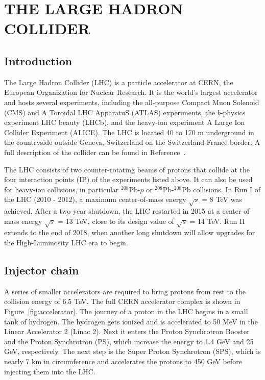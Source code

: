 \chapter{THE LARGE HADRON COLLIDER}
\label{chap:LHC}

\section{Introduction}
\label{sec:LHCintro}
The Large Hadron Collider (LHC) is a particle accelerator at CERN, the European Organization for Nuclear Research. It is the world's largest accelerator and hosts several experiments, including the all-purpose Compact Muon Solenoid (CMS) and A Toroidal LHC ApparatuS (ATLAS) experiments, the $b$-physics experiment LHC beauty (LHCb), and the heavy-ion experiment A Large Ion Collider Experiment (ALICE). The LHC is located 40 to 170 m underground in the countryside outside Geneva, Switzerland on the Switzerland-France border. A full description of the collider can be found in Reference~\cite{LHCMachine}.

The LHC consists of two counter-rotating beams of protons that collide at the four interaction points (IP) of the experiments listed above. It can also be used for heavy-ion collisions, in particular $^{208}$Pb-$p$ or $^{208}$Pb-$^{208}$Pb collisions. In Run I of the LHC (2010 - 2012), a maximum center-of-mass energy $\sqrt{s}$ = 8 TeV was achieved. After a two-year shutdown, the LHC restarted in 2015 at a center-of-mass energy $\sqrt{s}$ = 13 TeV, close to its design value of $\sqrt{s}$ = 14 TeV. Run II extends to the end of 2018, when another long shutdown will allow upgrades for the High-Luminosity LHC era to begin.

\section{Injector chain}
\label{sec:injector}
A series of smaller accelerators are required to bring protons from rest to the collision energy of 6.5 TeV. The full CERN accelerator complex is shown in Figure~\ref{fig:accelerator}. The journey of a proton in the LHC begins in a small tank of hydrogen. The hydrogen gets ionized and is accelerated to 50 MeV in the Linear Accelerator 2 (Linac 2). Next it enters the Proton Synchrotron Booster and the Proton Synchrotron (PS), which increase the energy to 1.4 GeV and 25 GeV, respectively. 
The next step is the Super Proton Synchrotron (SPS), which is nearly 7 km in circumference and accelerates the protons to 450 GeV before injecting them into the LHC. 

